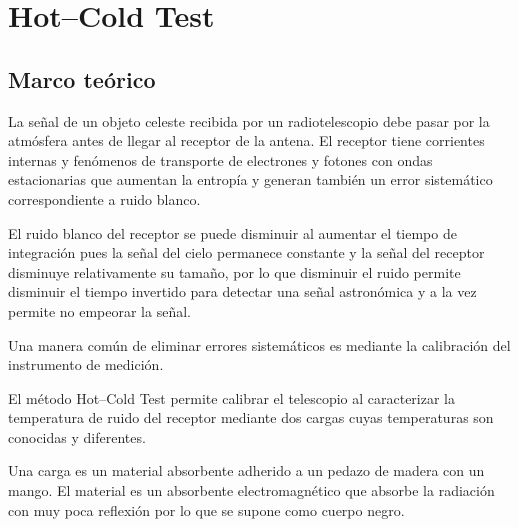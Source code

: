 \section{Hot--Cold Test}

\subsection{Marco teórico}

La señal de un objeto celeste recibida por un radiotelescopio debe pasar por la atmósfera antes de llegar al receptor de la antena. El receptor tiene corrientes internas y fenómenos de transporte de electrones y fotones con ondas estacionarias que aumentan la entropía y generan también un error sistemático correspondiente a ruido blanco.

El ruido blanco del receptor se puede disminuir al aumentar el tiempo de integración pues la señal del cielo permanece constante y la señal del receptor disminuye relativamente su tamaño, por lo que disminuir el ruido permite disminuir el tiempo invertido para detectar una señal astronómica y a la vez permite no empeorar la señal.

Una manera común de eliminar errores sistemáticos es mediante la calibración del instrumento de medición.

El método Hot--Cold Test permite calibrar el telescopio al caracterizar la temperatura de ruido del receptor mediante dos cargas cuyas temperaturas son conocidas y diferentes.

Una carga es un material absorbente adherido a un pedazo de madera con un mango. El material es un absorbente electromagnético que absorbe la radiación con muy poca reflexión por lo que se supone como cuerpo negro. %


